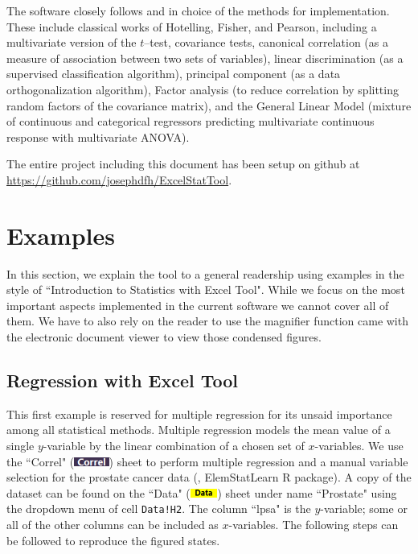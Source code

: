 \documentclass[article]{jss}
\numberwithin{equation}{subsection}
\newcommand{\shtData}{``Data" (\includegraphics[height=8pt, keepaspectratio=true]{DataSheetTab_png}) }
\newcommand{\shtCorrel}{``Correl" (\includegraphics[height=8pt, keepaspectratio=true]{CorrelSheetTab_png}) }
\begin{document}
  
        The software closely follows \cite{anderson2003introMVA3e} and \cite{johnson1992applied} in choice of the methods for implementation. These include classical works of Hotelling, Fisher, and Pearson, including a multivariate version of the  $t$--test, covariance tests, canonical correlation (as a measure of association between two sets of variables), linear discrimination (as a supervised classification algorithm),  principal component (as a data orthogonalization algorithm), Factor analysis (to reduce correlation by splitting random factors of the covariance matrix), and the General Linear Model (mixture of continuous and categorical regressors predicting multivariate continuous response with multivariate ANOVA).
        
        The entire project including this document has been setup on github at \url{https://github.com/josephdfh/ExcelStatTool}.
  
  
        \section[example]{Examples}        
            In this section, we explain the tool to a general readership using examples in the style of ``Introduction to Statistics with Excel Tool". While we focus on the most important aspects implemented in the current software we cannot cover all of them. We have to also rely on the reader to use the magnifier function came with the electronic document viewer to view those condensed figures.
                
        \subsection[egReg]{Regression with Excel Tool}
        This first example is reserved for multiple regression for its unsaid importance among all statistical methods. 
        Multiple regression models the mean value of a single $y$-variable by the linear combination of a chosen set of $x$-variables. 
        We use the \shtCorrel sheet to perform multiple regression and a manual variable selection for the prostate cancer data (\cite{stamey1989prostate}, ElemStatLearn R package). 
        A copy of the dataset can be found on the \shtData sheet under name ``Prostate" using the dropdown menu of cell \texttt{Data!H2}. 
        The column ``lpsa" is the $y$-variable; some or all of the other columns can be included as $x$-variables.
	    The following steps can be followed to reproduce the figured states.
	    
\end{document}
